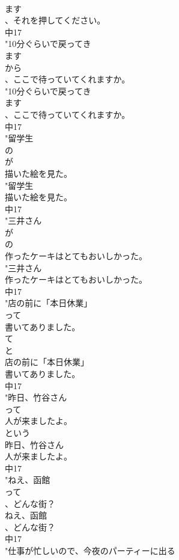 \documentclass[8pt]{extreport}
\begin{document}
\begin{CJK}{UTF8}{min}
\\	ます
\\	、それを押してください。
\\	中17
\\	"10分ぐらいで戻ってき
\\	ます
\\	から
\\	、ここで待っていてくれますか。
\\	"10分ぐらいで戻ってき
\\	ます
\\	、ここで待っていてくれますか。
\\	中17
\\	"留学生
\\	の
\\	が
\\	描いた絵を見た。
\\	"留学生
\\	描いた絵を見た。
\\	中17
\\	"三井さん
\\	が
\\	の
\\	作ったケーキはとてもおいしかった。
\\	"三井さん
\\	作ったケーキはとてもおいしかった。
\\	中17
\\	"店の前に「本日休業」
\\	って
\\	書いてありました。 
\\	て
\\	と	
\\	店の前に「本日休業」
\\	書いてありました。
\\	中17
\\	"昨日、竹谷さん
\\	って
\\	人が来ましたよ。
\\	という	
\\	昨日、竹谷さん
\\	人が来ましたよ。
\\	中17
\\	"ねえ、函館
\\	って
\\	、どんな街？
\\	ねえ、函館
\\	、どんな街？
\\	中17
\\	"仕事が忙しいので、今夜のパーティーに出る

\end{CJK}
\end{document}
